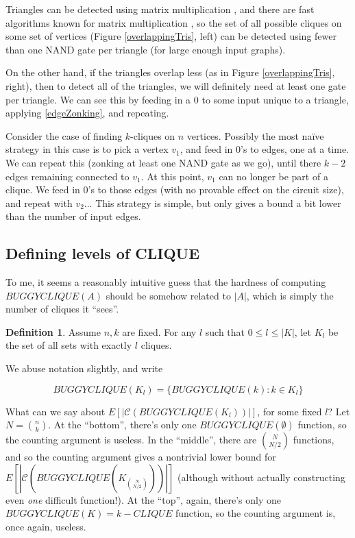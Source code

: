 \documentclass[12pt]{article}
\theoremstyle{definition}
\newtheorem{defn}{Definition}[section]
\newcommand{\bigC}[0]{\mathcal{C}}
\begin{document}
Triangles can be detected using matrix multiplication \cite{itai_finding_1977},
and there are fast algorithms known for matrix multiplication
\cite{strassen_gaussian_1969}
\cite{williams_multiplying_2012}, so the set of all possible
cliques on some set of vertices (Figure \ref{overlappingTris}, left)
 can be detected
using fewer than one NAND gate per triangle (for large enough input graphs).

On the other hand, if the triangles overlap less (as in
Figure \ref{overlappingTris}, right),
then to detect all of the triangles, we will definitely need at least one
gate per triangle. We can see this by feeding in a 0 to some input
unique to a triangle, applying \ref{edgeZonking}, and repeating.

Consider the case of finding $k$-cliques on $n$ vertices.
Possibly the most na\"ive strategy in this case is to pick a vertex $v_1$,
and feed in 0's to edges, one at a time. We can repeat this
(zonking at least one NAND gate as we go), until there
$k-2$ edges remaining connected to $v_1$. At this point, $v_1$ can no
longer be part of a clique. We feed in 0's to those edges (with no
provable effect on the circuit size), and repeat with $v_2$...
This strategy is simple, but only gives a bound a bit lower than
the number of input edges.

\subsection{Defining levels of CLIQUE}

To me, it seems a reasonably intuitive guess that the hardness of
computing $BUGGYCLIQUE(A)$ should be somehow related to
$|A|$, which is simply the number of cliques it ``sees''.

\begin{defn}
\label{CLIQUE-level}
Assume $n, k$ are fixed. For any $l$ such that
$0 \le l \le |K|$, let $K_l$ be the set of all sets
with exactly $l$ cliques. 
\end{defn}

We abuse notation slightly, and write

\[
BUGGYCLIQUE(K_l) = \{ BUGGYCLIQUE(k) : k \in K_l \}
\]

What can we say about $E[|\bigC(BUGGYCLIQUE(K_l))|]$, for
some fixed $l$? Let $N = {n \choose k}$.
At the ``bottom'', there's only one $BUGGYCLIQUE(\emptyset)$
function, so the counting argument is useless.
In the ``middle'',
there are ${N \choose {N/2}}$ functions, and so the counting
argument gives a nontrivial lower bound for
$E[|\bigC(BUGGYCLIQUE(K_{N \choose {N/2}}))|]$ (although
without actually constructing even {\em one} difficult function!).
At the ``top'', again, there's only one $BUGGYCLIQUE(K) = k-CLIQUE$
function, so the counting argument is, once again, useless.
\end{document}
